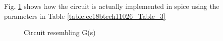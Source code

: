\begin{enumerate}[label=\arabic*.,ref=\theenumi]
Fig. \ref{fig:ee18btech110026_circuit_2} shows how the circuit is actually implemented in spice using the parameters in Table \ref{table:ee18btech11026_Table_3}  

\begin{figure}[!ht]
	\begin{center}
				\resizebox{\columnwidth}{!}{}
	\end{center}
\caption{Circuit resembling G(s)}
\label{fig:ee18btech110026_circuit_2}
\end{figure}
\renewcommand{\thefigure}{\theenumi}

\begin{table}[!ht]
\centering

\caption{}
\label{table:ee18btech11026_Table_3}
\end{table}

\end{enumerate}

